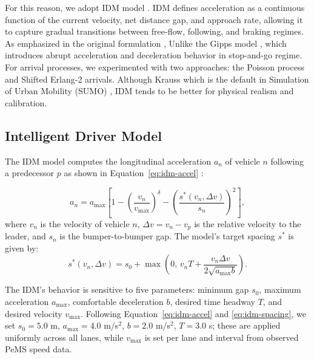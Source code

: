 \documentclass{scspaperproc}
\theoremstyle{scsthe}
\begin{document}
For this reason, we adopt IDM model \cite{treiber2000congested}. IDM defines acceleration as a continuous function of the current velocity, net distance gap, and approach rate, allowing it to capture gradual transitions between free-flow, following, and braking regimes. As emphasized in the original formulation \cite{treiber2000congested}, Unlike the Gipps model \cite{gipps1981behavioural}, which introduces abrupt acceleration and deceleration behavior in stop-and-go regime. For arrival processes, we experimented with two approaches: the Poisson process and Shifted Erlang‑2 arrivals.
Although Krauss which is the default in Simulation of Urban Mobility (SUMO) \cite{lopez2018microscopic}, IDM tends to be better for physical realism and calibration.

\subsection{Intelligent Driver Model}

The IDM model computes the longitudinal acceleration
$a_n$ of vehicle $n$ following a predecessor $p$ as shown in Equation~\eqref{eq:idm-accel}  \cite{treiber2000congested}:

\begin{equation}
\label{eq:idm-accel}
a_n = a_{\max} \left[
1 - \left( \frac{v_n}{v_{\max}} \right)^\delta
- \left( \frac{s^*(v_n, \Delta v)}{s_n} \right)^2
\right],
\end{equation}
where $v_n$ is the velocity of vehicle $n$, $\Delta v = v_n - v_p$ is the
relative velocity to the leader, and $s_n$ is the bumper-to-bumper gap.
The model's target spacing $s^*$ is given by:
\begin{equation}
\label{eq:idm-spacing}
s^*(v_n, \Delta v) =
s_0 + \max\!\left(0,\, v_n T + \frac{v_n \Delta v}{2\sqrt{a_{\max} b}} \right).
\end{equation}

The IDM's behavior is sensitive to five parameters: minimum gap $s_0$, maximum acceleration $a_{\max}$, comfortable deceleration $b$, desired time headway $T$, and desired velocity $v_{\max}$.
Following Equation~\eqref{eq:idm-accel} and \eqref{eq:idm-spacing}, we set $s_0 = 5.0$ m, $a_{\max} = 4.0$ m/s$^2$, $b = 2.0$ m/s$^2$, $T = 3.0$ s; these are applied uniformly across all lanes, while $v_{\max}$ is set per lane and interval from observed PeMS speed data.
\end{document}
